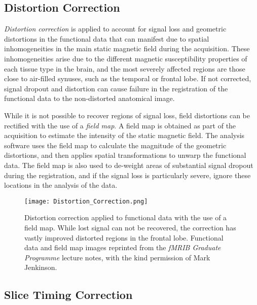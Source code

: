 \subsection{Distortion Correction}

\textit{Distortion correction} is applied to account for signal loss and geometric distortions in the functional data that can manifest due to spatial inhomogeneities in the main static magnetic field during the acquisition. These inhomogeneities arise due to the different magnetic susceptibility properties of each tissue type in the brain, and the most severely affected regions are those close to air-filled synuses, such as the temporal or frontal lobe. If not corrected, signal dropout and distortion can cause failure in the registration of the functional data to the non-distorted anatomical image. 

While it is not possible to recover regions of signal loss, field distortions can be rectified with the use of a \textit{field map}. A field map is obtained as part of the acquisition to estimate the intensity of the static magnetic field. The analysis software uses the field map to calculate the magnitude of the geometric distortions, and then applies spatial transformations to unwarp the functional data.  The field map is also used to de-weight areas of substantial signal dropout during the registration, and if the signal loss is particularly severe, ignore these locations in the analysis of the data. 

\begin{figure}[!ht]
\centering
	\texttt{[image: Distortion\_Correction.png]}
\caption[Distortion correction applied to functional data with the use of a field map. While lost signal can not be recovered, the correction has vastly improved distorted regions in the frontal lobe. Functional data and field map images reprinted from the \textit{fMRIB Graduate Programme} lecture notes, with the kind permission of Mark Jenkinson.]{Distortion correction applied to functional data with the use of a field map. While lost signal can not be recovered, the correction has vastly improved distorted regions in the frontal lobe. Functional data and field map images reprinted from the \textit{fMRIB Graduate Programme} lecture notes\footnotemark, with the kind permission of Mark Jenkinson.}
\label{fig:Distortion_Correction}
\end{figure}

\subsection{Slice Timing Correction}


